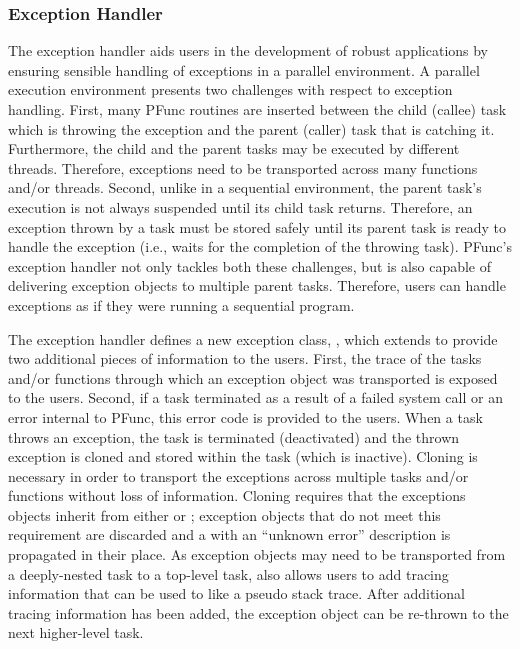 \subsubsection{Exception Handler}
\label{subsubsec:exception_handler}

The exception handler aids users in the development of robust applications by
ensuring sensible handling of exceptions in a parallel environment.
%
A parallel execution environment presents two challenges with respect to
exception handling. 
%
First, many PFunc routines are inserted between the child (callee) task which
is throwing the exception and the parent (caller) task that is catching it. 
%
Furthermore, the child and the parent tasks may be executed by different
threads. 
%
Therefore, exceptions need to be transported across many functions and/or
threads.
%
Second, unlike in a sequential environment, the parent task's execution is not always 
suspended until its child task returns. 
%
Therefore, an exception thrown by a task must be stored safely until its parent
task is ready to handle the exception (i.e., waits for the completion of the
throwing task).
%
PFunc's exception handler not only tackles both these challenges, but is also 
capable of delivering exception objects to multiple parent tasks.
%
Therefore, users can handle exceptions as if they were running a sequential
program. 
%
                                
The exception handler defines a new exception class, ,
which extends  to provide two additional pieces of
information to the users. 
%
First, the trace of the tasks and/or functions through which an exception
object was transported is exposed to the users.
%
Second, if a task terminated as a result of a failed system call or an error
internal to PFunc, this error code is provided to the users.
%
When a task throws an exception, the task is terminated (deactivated) and the
thrown exception is cloned and stored within the task (which is inactive).
%
Cloning is necessary in order to transport the exceptions across multiple tasks
and/or functions without loss of information.
%
Cloning requires that the exceptions objects inherit from either
 or ; exception objects that do not
meet this requirement are discarded and a  with an
``unknown error'' description is propagated in their place.
%
As exception objects may need to be transported from a deeply-nested task to a
top-level task,  also allows users to add tracing
information that can be used to like a pseudo stack trace.
%
After additional tracing information has been added, the exception object can
be re-thrown to the next higher-level task.
% 


